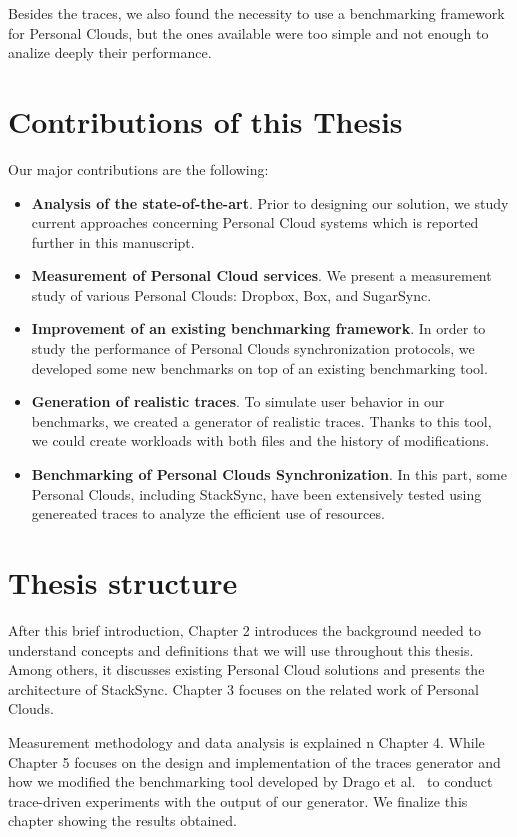 Besides the traces, we also found the necessity to use a benchmarking framework for Personal Clouds, but the
ones available were too simple and not enough to analize deeply their performance.

\section{Contributions of this Thesis}
Our major contributions are the following:

\begin{itemize}
	\item \textbf{Analysis of the state-of-the-art}. Prior to designing our solution, we study current approaches concerning Personal Cloud systems which is reported further in this manuscript.
	\item \textbf{Measurement of Personal Cloud services}. We present a measurement study of various Personal Clouds: Dropbox, Box, and SugarSync.
	\item \textbf{Improvement of an existing benchmarking framework}. In order to study the performance of Personal
	Clouds synchronization protocols, we developed some new benchmarks on top of an existing benchmarking tool.
	\item \textbf{Generation of realistic traces}. To simulate user behavior in our benchmarks, we created a
	generator of realistic traces. Thanks to this tool, we could create workloads with both files and the history of modifications.
	\item \textbf{Benchmarking of Personal Clouds Synchronization}. In this part, some Personal Clouds, including StackSync, have
	been extensively tested using genereated traces to analyze the efficient use of resources.	
\end{itemize}

\section{Thesis structure}
After this brief introduction, Chapter 2 introduces the background needed to understand concepts
and definitions that we will use throughout this thesis. Among others, it discusses existing Personal Cloud solutions and presents the architecture of StackSync. Chapter 3 focuses on the related work of Personal Clouds.

Measurement methodology and data analysis is explained n Chapter 4. While Chapter 5 focuses on the design and implementation of the traces generator and how we modified the benchmarking tool developed by Drago et al.~\cite{drago2013benchmarking} to conduct trace-driven experiments with the output of our generator. We finalize this chapter showing the results obtained.

